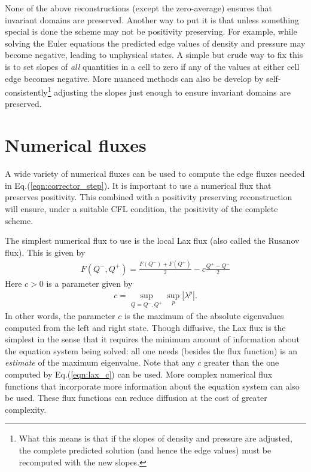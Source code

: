 \documentclass[11pt, reqno]{amsart}
\newcommand{\eqr}[1]{Eq.\thinspace(#1)}
\theoremstyle{definition}
\begin{document}
None of the above reconstructions (except the zero-average) ensures
that invariant domains are preserved. Another way to put it is that
unless something special is done the scheme may not be positivity
preserving. For example, while solving the Euler equations the
predicted edge values of density and pressure may become negative,
leading to unphysical states. A simple but crude way to fix this is to
set slopes of \emph{all} quantities in a cell to zero if any of the
values at either cell edge becomes negative. More nuanced methods can
also be develop by self-consistently\footnote{What this means is that
  if the slopes of density and pressure are adjusted, the complete
  predicted solution (and hence the edge values) must be recomputed
  with the new slopes.} adjusting the slopes just enough to ensure
invariant domains are preserved.

\section{Numerical fluxes}

A wide variety of numerical fluxes can be used to compute the edge
fluxes needed in \eqr{\ref{eqn:corrector_step}}. It is important to
use a numerical flux that preserves positivity. This combined with a
positivity preserving reconstruction will ensure, under a suitable CFL
condition, the positivity of the complete scheme.

The simplest numerical flux to use is the local Lax flux (also called
the Rusanov flux). This is given by
\begin{align}
  F(Q^-,Q^+) = \frac{F(Q^-) + F(Q^+)}{2} - c\frac{Q^+- Q^-}{2}
\end{align}
Here $c>0$ is a parameter given by
\begin{align}
  c = \sup_{Q=Q^-,Q^+} \sup_p | \lambda^p |. \label{eqn:lax_c}
\end{align}
In other words, the parameter $c$ is the maximum of the absolute
eigenvalues computed from the left and right state. Though diffusive,
the Lax flux is the simplest in the sense that it requires the minimum
amount of information about the equation system being solved: all one
needs (besides the flux function) is an \emph{estimate} of the maximum
eigenvalue. Note that any $c$ greater than the one computed by
\eqr{\ref{eqn:lax_c}} can be used. More complex numerical flux
functions that incorporate more information about the equation system
can also be used. These flux functions can reduce diffusion at the
cost of greater complexity.
\end{document}
